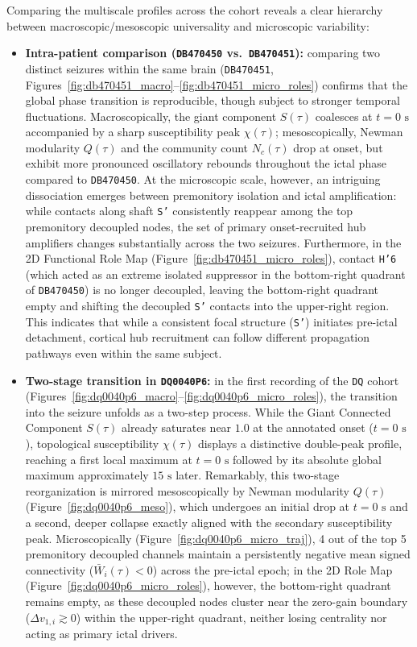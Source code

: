Comparing the multiscale profiles across the cohort reveals a clear hierarchy between macroscopic/mesoscopic universality and microscopic variability:

\begin{itemize}
    \item \textbf{Intra-patient comparison (\texttt{DB470450} vs.\ \texttt{DB470451}):} comparing two distinct seizures within the same brain (\texttt{DB470451}, Figures~\ref{fig:db470451_macro}--\ref{fig:db470451_micro_roles}) confirms that the global phase transition is reproducible, though subject to stronger temporal fluctuations. Macroscopically, the giant component $S(\tau)$ coalesces at $t = 0\text{ s}$ accompanied by a sharp susceptibility peak $\chi(\tau)$; mesoscopically, Newman modularity $Q(\tau)$ and the community count $N_c(\tau)$ drop at onset, but exhibit more pronounced oscillatory rebounds throughout the ictal phase compared to \texttt{DB470450}. At the microscopic scale, however, an intriguing dissociation emerges between premonitory isolation and ictal amplification: while contacts along shaft \texttt{S'} consistently reappear among the top premonitory decoupled nodes, the set of primary onset-recruited hub amplifiers changes substantially across the two seizures. Furthermore, in the 2D Functional Role Map (Figure~\ref{fig:db470451_micro_roles}), contact \texttt{H'6} (which acted as an extreme isolated suppressor in the bottom-right quadrant of \texttt{DB470450}) is no longer decoupled, leaving the bottom-right quadrant empty and shifting the decoupled \texttt{S'} contacts into the upper-right region. This indicates that while a consistent focal structure (\texttt{S'}) initiates pre-ictal detachment, cortical hub recruitment can follow different propagation pathways even within the same subject.

    \item \textbf{Two-stage transition in \texttt{DQ0040P6}:} in the first recording of the \texttt{DQ} cohort (Figures~\ref{fig:dq0040p6_macro}--\ref{fig:dq0040p6_micro_roles}), the transition into the seizure unfolds as a two-step process. While the Giant Connected Component $S(\tau)$ already saturates near $1.0$ at the annotated onset ($t = 0\text{ s}$), topological susceptibility $\chi(\tau)$ displays a distinctive double-peak profile, reaching a first local maximum at $t = 0\text{ s}$ followed by its absolute global maximum approximately $15\text{ s}$ later. Remarkably, this two-stage reorganization is mirrored mesoscopically by Newman modularity $Q(\tau)$ (Figure~\ref{fig:dq0040p6_meso}), which undergoes an initial drop at $t = 0\text{ s}$ and a second, deeper collapse exactly aligned with the secondary susceptibility peak. Microscopically (Figure~\ref{fig:dq0040p6_micro_traj}), 4 out of the top 5 premonitory decoupled channels maintain a persistently negative mean signed connectivity ($\bar{W}_i(\tau) < 0$) across the pre-ictal epoch; in the 2D Role Map (Figure~\ref{fig:dq0040p6_micro_roles}), however, the bottom-right quadrant remains empty, as these decoupled nodes cluster near the zero-gain boundary ($\Delta v_{1,i} \gtrsim 0$) within the upper-right quadrant, neither losing centrality nor acting as primary ictal drivers.


\end{itemize}
